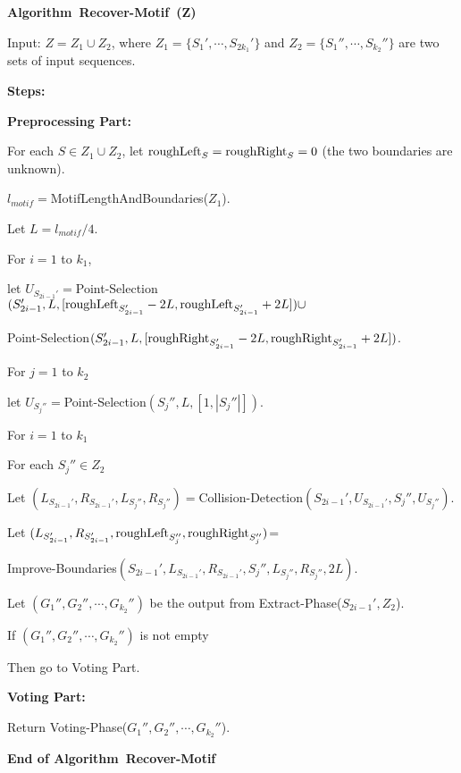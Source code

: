 \documentclass[11pt]{article}
\newcommand{\algmnam}{Recover-Motif}
\newcommand{\algmname}{Algorithm~\algmnam}
\newcommand{\algma}{\algmname~}
\newcommand{\roughright}{{\rm roughRight}}
\newcommand{\phasetwo}{Extract-Phase}
\newcommand{\phasethree}{Voting-Phase}
\begin{document}
{\bf \algma(Z)}


Input: $Z=Z_1\cup Z_2$, where $Z_1=\{S_1',\cdots, S_{2k_1}'\}$ and
$Z_2=\{S_1'',\cdots, S_{k_2}''\}$ are two sets of input sequences.

{\bf Steps:}


{\bf Preprocessing Part:}

For each $S\in Z_1\cup Z_2$, let $\roughleft_S=\roughright_S=0$ (the
two boundaries are unknown).

$l_{motif}=$MotifLengthAndBoundaries($Z_1$).


Let $L=l_{motif}/4$.

For $i=1$ to $k_1$,

\qquad let $U_{S_{2i-1}'}=$Point-Selection$(S_{2i-1}',L,
[{\rm roughLeft}_{S_{2i-1}'}-2L, {\rm roughLeft}_{S_{2i-1}'}+2L])\cup$

\qquad \qquad \qquad\hskip 13pt Point-Selection$(S_{2i-1}',L,
[\roughright_{S_{2i-1}'}-2L, \roughright_{S_{2i-1}'}+2L])$.


For $j=1$ to $k_2$

\qquad let $U_{S_j''}=$Point-Selection$(S_j'',L,[1,|S_j''|])$.


For $i=1$ to $k_1$



\qquad For each $S_j''\in Z_2$

\qquad\qquad Let $(L_{S_{2i-1}'}, R_{S_{2i-1}'},
L_{S_j''},R_{S_j''})=$Collision-Detection$(S_{2i-1}', U_{S_{2i-1}'},
S_j'', U_{S_j''})$.

\qquad\qquad Let $(L_{S_{2i-1}'}, R_{S_{2i-1}'},
\roughleft_{S_j''},\roughright_{S_j''})$=

\qquad\qquad\qquad Improve-Boundaries$(S_{2i-1}',L_{S_{2i-1}'},
R_{S_{2i-1}'}, S_j'', L_{S_j''}, R_{S_j''}, 2L)$.



\qquad Let $(G_1'', G_2'',\cdots, G_{k_2}'')$ be the output from
\phasetwo($S_{2i-1}', Z_2$).



\qquad If $(G_1'', G_2'',\cdots, G_{k_2}'')$ is not empty

\qquad Then go to Voting Part.



{\bf Voting Part:}

\qquad Return \phasethree($G_1'', G_2'',\cdots, G_{k_2}''$).

{\bf End of \algma}
\end{document}
